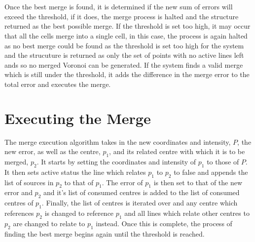 \\
\\
Once the best merge is found, it is determined if the new sum of errors will exceed the threshold, if it does, the merge process is halted and the structure returned as the best possible merge. If the threshold is set too high, it may occur that all the cells merge into a single cell, in this case, the process is again halted as no best merge could be found as the threshold is set too high for the system and the strucuture is returned as only the set of points with no active lines left ands so no merged Voronoi can be generated. If the system finds a valid merge which is still under the threshold, it adds the difference in the merge error to the total error and executes the merge.

\section{Executing the Merge}
The merge execution algorithm takes in the new coordinates and intensity, $P$, the new error, as well as the centre, $p_1$, and its related centre with which it is to be merged, $p_2$. It starts by setting the coordinates and intensity of $p_1$ to those of $P$. It then sets active status the line which relates $p_1$ to $p_2$ to false and appends the list of sources in $p_2$ to that of $p_1$. The error of $p_1$ is then set to that of the new error and $p_2$ and it's list of consumed centres is added to the list of consumed centres of $p_1$. Finally, the list of centres is iterated over and any centre which references $p_2$ is changed to reference $p_1$ and all lines which relate other centres to $p_2$ are changed to relate to $p_1$ instead. Once this is complete, the process of finding the best merge begins again until the threshold is reached.
